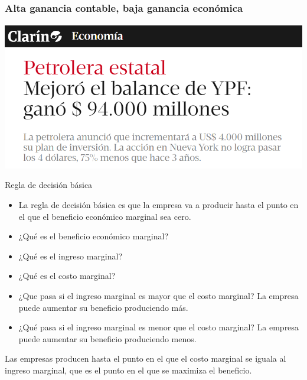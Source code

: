 \documentclass{beamer}
\begin{document}
\begin{frame}
    \frametitle{Alta ganancia contable, baja ganancia económica}
    \centering
    \includegraphics[scale=0.5]{../Figures/YPF.png}
\end{frame}

\begin{frame}{Regla de decisión básica}

    \begin{itemize}
        \item La regla de decisión básica es que la empresa va a producir hasta el punto en el que el beneficio económico marginal sea cero.
        \item ¿Qué es el beneficio económico marginal?
        \item ¿Qué es el ingreso marginal?
        \item ¿Qué es el costo marginal?
        \item ¿Que pasa si el ingreso marginal es mayor que el costo marginal? La empresa puede aumentar su beneficio produciendo más.
        \item ¿Qué pasa si el ingreso marginal es menor que el costo marginal? La empresa puede aumentar su beneficio produciendo menos.
    \end{itemize}

    \begin{boxA}
        \begin{center}
            Las empresas producen hasta el punto en el que el costo marginal se iguala al ingreso marginal, que es el punto en el que se maximiza el beneficio.
        \end{center}
    \end{boxA}
\end{frame}
\end{document}
